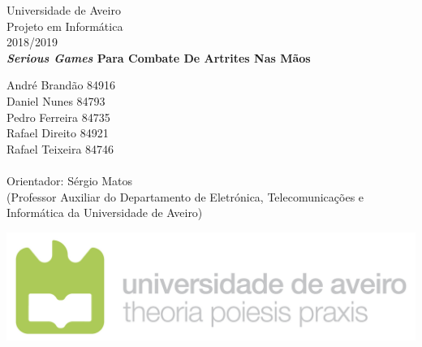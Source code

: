 \documentclass{TTUPhD}
\newcommand{\ThesisTitleENG}{\textit{Serious Games} Para Combate De Artrites Nas Mãos} %
\newcommand{\ThesisNumber}{2018/2019} %
\begin{document}
\begin{centering}

{\LARGE
Universidade de Aveiro \\
Projeto em Informática \\
\ThesisNumber \\
}
\vspace{3.5cm}
{\huge
\bf{
\ThesisTitleENG \\
}
}
\end{centering}

\vspace{3.2cm}

{\fontsize{16}{19.2} \hspace{-0.53cm} André Brandão \hspace{0.5cm} 84916 \\ Daniel Nunes \hspace{0.81cm} 84793 \\
Pedro Ferreira \hspace{0.61cm} 84735 \\ Rafael Direito \hspace{0.71cm} 84921 \\ Rafael Teixeira \hspace{0.59cm} 84746 \\\\
Orientador: Sérgio Matos \\(Professor Auxiliar do Departamento de Eletrónica, Telecomunicações e Informática da Universidade de Aveiro)} \\
\vspace{2.5cm}%

\begin{centering}
\includegraphics[scale=0.4]{./img/logo_ua.jpg}\\
\end{centering}

\thispagestyle{empty}
\newpage

\thispagestyle{empty}

\end{document}
